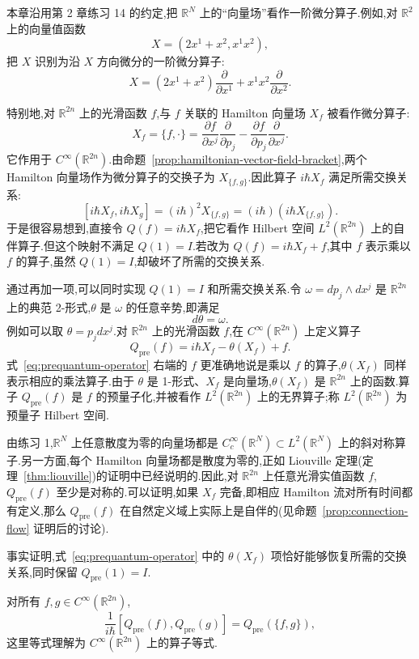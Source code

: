 本章沿用第 2 章练习 14 的约定,把 $\mathbb R^N$ 上的“向量场”看作一阶微分算子.例如,对 $\mathbb R^2$ 上的向量值函数
\[
 X=(2x^1+x^2,x^1x^2),
\]
把 $X$ 识别为沿 $X$ 方向微分的一阶微分算子:
\[
 X=(2x^1+x^2)\frac{\partial}{\partial x^1}
 +x^1x^2\frac{\partial}{\partial x^2}.
\]

特别地,对 $\mathbb R^{2n}$ 上的光滑函数 $f$,与 $f$ 关联的 Hamilton 向量场 $X_f$ 被看作微分算子:
\[
 X_f=\{f,\cdot\}
 =\frac{\partial f}{\partial x^j}\frac{\partial}{\partial p_j}
 -\frac{\partial f}{\partial p_j}\frac{\partial}{\partial x^j}.\label{eq:euclidean-hamiltonian-vector-field}
\]
它作用于 $C^\infty(\mathbb R^{2n})$.由命题~\ref{prop:hamiltonian-vector-field-bracket},两个 Hamilton 向量场作为微分算子的交换子为 $X_{\{f,g\}}$.因此算子 $i\hbar X_f$ 满足所需交换关系:
\[
 [i\hbar X_f,i\hbar X_g]
 =(i\hbar)^2X_{\{f,g\}}
 =(i\hbar)(i\hbar X_{\{f,g\}}).
\]
于是很容易想到,直接令 $Q(f)=i\hbar X_f$,把它看作 Hilbert 空间 $L^2(\mathbb R^{2n})$ 上的自伴算子.但这个映射不满足 $Q(1)=I$.若改为 $Q(f)=i\hbar X_f+f$,其中 $f$ 表示乘以 $f$ 的算子,虽然 $Q(1)=I$,却破坏了所需的交换关系.

通过再加一项,可以同时实现 $Q(1)=I$ 和所需交换关系.令 $\omega=dp_j\wedge dx^j$ 是 $\mathbb R^{2n}$ 上的典范 2-形式,$\theta$ 是 $\omega$ 的任意辛势,即满足
\[
 d\theta=\omega.\label{eq:symplectic-potential}
\]
例如可以取 $\theta=p_jdx^j$.对 $\mathbb R^{2n}$ 上的光滑函数 $f$,在 $C^\infty(\mathbb R^{2n})$ 上定义算子
\[
 Q_{\mathrm{pre}}(f)
 =i\hbar X_f-\theta(X_f)+f.\label{eq:prequantum-operator}
\]
式~\eqref{eq:prequantum-operator} 右端的 $f$ 更准确地说是乘以 $f$ 的算子,$\theta(X_f)$ 同样表示相应的乘法算子.由于 $\theta$ 是 1-形式、$X_f$ 是向量场,$\theta(X_f)$ 是 $\mathbb R^{2n}$ 上的函数.算子 $Q_{\mathrm{pre}}(f)$ 是 $f$ 的预量子化,并被看作 $L^2(\mathbb R^{2n})$ 上的无界算子;称 $L^2(\mathbb R^{2n})$ 为预量子 Hilbert 空间.

由练习 1,$\mathbb R^N$ 上任意散度为零的向量场都是 $C_c^\infty(\mathbb R^N)\subset L^2(\mathbb R^N)$ 上的斜对称算子.另一方面,每个 Hamilton 向量场都是散度为零的,正如 Liouville 定理(定理~\ref{thm:liouville})的证明中已经说明的.因此,对 $\mathbb R^{2n}$ 上任意光滑实值函数 $f$,$Q_{\mathrm{pre}}(f)$ 至少是对称的.可以证明,如果 $X_f$ 完备,即相应 Hamilton 流对所有时间都有定义,那么 $Q_{\mathrm{pre}}(f)$ 在自然定义域上实际上是自伴的(见命题~\ref{prop:connection-flow} 证明后的讨论).

事实证明,式~\eqref{eq:prequantum-operator} 中的 $\theta(X_f)$ 项恰好能够恢复所需的交换关系,同时保留 $Q_{\mathrm{pre}}(1)=I$.

\begin{proposition}\label{prop:prequantum-commutator}
对所有 $f,g\in C^\infty(\mathbb R^{2n})$,
\[
 \frac1{i\hbar}[Q_{\mathrm{pre}}(f),Q_{\mathrm{pre}}(g)]
 =Q_{\mathrm{pre}}(\{f,g\}),
\]
这里等式理解为 $C^\infty(\mathbb R^{2n})$ 上的算子等式.
\end{proposition}

